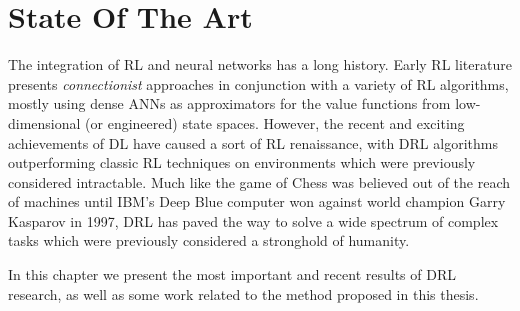 \chapter{State Of The Art}
\label{chapter3_state_of_the_art}
\thispagestyle{empty}

\vspace{0.5cm}

The integration of RL and neural networks has a long history. Early 
RL literature \cite{rummery1994line, tesauro1995temporal, bertsekas1995neuro}
presents \textit{connectionist} approaches in conjunction with a variety
of RL algorithms, mostly using dense ANNs as approximators for the value 
functions from low-dimensional (or engineered) state spaces.
However, the recent and exciting achievements of DL have caused a sort of RL 
renaissance, with DRL algorithms outperforming classic RL techniques on 
environments which were previously considered intractable. 
Much like the game of Chess was believed out of the reach of machines until 
IBM's Deep Blue computer \cite{campbell2002deep} won against world champion 
Garry Kasparov in 1997, DRL has paved the way to solve a wide spectrum of 
complex tasks which were previously considered a stronghold of humanity. 

In this chapter we present the most important and recent results of DRL research, 
as well as some work related to the method proposed in this thesis.

